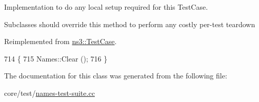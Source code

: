 Implementation to do any local setup required for this Test\+Case. 

Subclasses should override this method to perform any costly per-\/test teardown 

Reimplemented from \hyperlink{classns3_1_1TestCase_a8917f1604e28d312a8086f76291e3c46}{ns3\+::\+Test\+Case}.


\begin{DoxyCode}
714 \{
715   Names::Clear ();
716 \}
\end{DoxyCode}


The documentation for this class was generated from the following file\+:\begin{DoxyCompactItemize}
\item 
core/test/\hyperlink{names-test-suite_8cc}{names-\/test-\/suite.\+cc}\end{DoxyCompactItemize}
